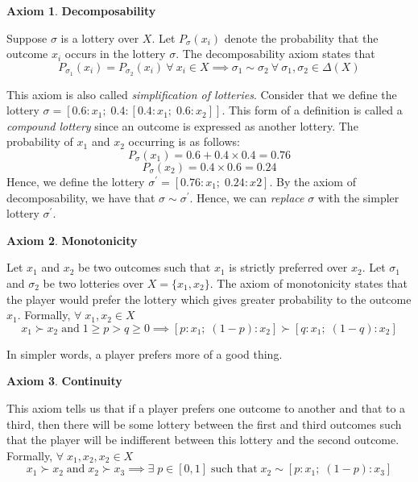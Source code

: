 \documentclass{article}
\theoremstyle{definition}
\newtheorem{ax}{Axiom}
\begin{document}
\begin{ax}
\textbf{Decomposability}

Suppose $\sigma$ is a lottery over $X$. Let $P_\sigma(x_i)$ denote the probability that the outcome $x_i$ occurs in the lottery $\sigma$. The decomposability axiom states that
\[
    P_{\sigma_1}(x_i) = P_{\sigma_2}(x_i) \: \forall \: x_i \in X \implies \sigma_1 \sim \sigma_2 \: \forall \: \sigma_1, \sigma_2 \in \Delta(X)
\]

This axiom is also called \textit{simplification of lotteries}. Consider that we define the lottery $\sigma = [0.6 : x_1 ; \; 0.4 : [0.4 : x_1; \; 0.6 : x_2]]$. This form of a definition is called a \textit{compound lottery} since an outcome is expressed as another lottery. The probability of $x_1$ and $x_2$ occurring is as follows:
\[
    P_\sigma(x_1) = 0.6 + 0.4 \times 0.4 = 0.76
\]
\[
    P_\sigma(x_2) = 0.4 \times 0.6 = 0.24
\]
Hence, we define the lottery $\sigma^{\prime} = [0.76 : x_1; \; 0.24 : x2]$. By the axiom of decomposability, we have that $\sigma \sim \sigma^{\prime}$. Hence, we can \textit{replace} $\sigma$ with the simpler lottery $\sigma^{\prime}$.
\end{ax}

\begin{ax}
\textbf{Monotonicity}

Let $x_1$ and $x_2$ be two outcomes such that $x_1$ is strictly preferred over $x_2$. Let $\sigma_1$ and $\sigma_2$ be two lotteries over $X = \{ x_1, x_2 \}$. The axiom of monotonicity states that the player would prefer the lottery which gives greater probability to the outcome $x_1$. Formally, $\forall \; x_1, x_2 \in X$
\[
    x_1 \succ x_2 \; \text{and} \; 1 \geq p > q \geq 0 \implies [p : x_1; \; (1-p) : x_2] \succ [q : x_1; \; (1-q) : x_2]
\]

In simpler words, a player prefers more of a good thing.
\end{ax}

\begin{ax}
\textbf{Continuity}

This axiom tells us that if a player prefers one outcome to another and that to a third, then there will be some lottery between the first and third outcomes such that the player will be indifferent between this lottery and the second outcome. Formally, $\forall \; x_1, x_2, x_2 \in X$
\[
    x_1 \succ x_2 \; \text{and} \; x_2 \succ x_3 \implies \exists \; p \in [0,1] \; \text{such that} \; x_2 \sim [p:x_1; \; (1-p) : x_3]
\]
\end{ax}
\end{document}

